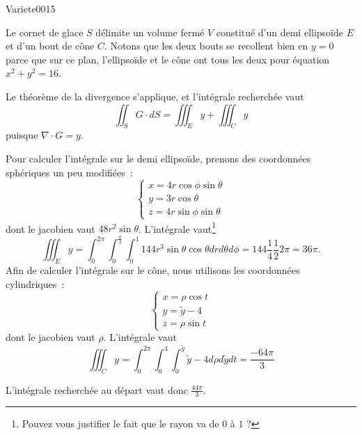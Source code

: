 
\begin{corrige}{Variete0015}

Le cornet de glace $S$ délimite un volume fermé $V$ constitué d'un demi ellipsoïde $E$ et d'un bout de cône $C$. Notons que les deux bouts se recollent bien en $y=0$ parce que sur ce plan, l'ellipsoïde et le cône ont tous les deux pour équation  $x^2+y^2=16$.

Le théorème de la divergence s'applique, et l'intégrale recherchée vaut
\begin{equation*}
  \iint_S G \cdot d S = \iiint_E y + \iiint_C y
\end{equation*}
puisque $\nabla\cdot G = y$.

Pour calculer l'intégrale sur le demi ellipsoïde, prenons des coordonnées sphériques un peu modifiées~:
\begin{equation*}
  \begin{cases}
    x = 4 r \cos \phi \sin \theta\\
    y = 3 r \cos \theta\\
    z = 4 r \sin \phi \sin \theta
  \end{cases}
\end{equation*}
dont le jacobien vaut $48 r^2 \sin \theta$. L'intégrale vaut\footnote{Pouvez vous justifier le fait que le rayon va de $0$ à $1$ ?}
\begin{equation*}
  \iiint_E y = %
  \int_0^{2\pi} \int_0^{\frac\pi2} \int_0^1 144 r^3 \sin\theta\cos\theta%
  d r d \theta d \phi =%
  144 \frac 14 \frac 12 2 \pi = 36 \pi.
\end{equation*}
Afin de calculer l'intégrale sur le cône, nous utilisons les coordonnées cylindriques~:
\begin{equation*}
  \begin{cases}
    x = \rho \cos t\\
    y = \tilde y - 4\\
    z = \rho \sin t
  \end{cases}
\end{equation*}
dont le jacobien vaut $\rho$. L'intégrale vaut
\begin{equation*}
  \iiint_C y = \int_0^{2\pi} \int_0^4 \int_0^{\tilde y} \tilde y - 4
  d\rho d\tilde yd t = \frac{- 64 \pi}{3}
\end{equation*}

L'intégrale recherchée au départ vaut donc \begin{math}
  \frac {44 \pi}3
\end{math}.

\end{corrige}
